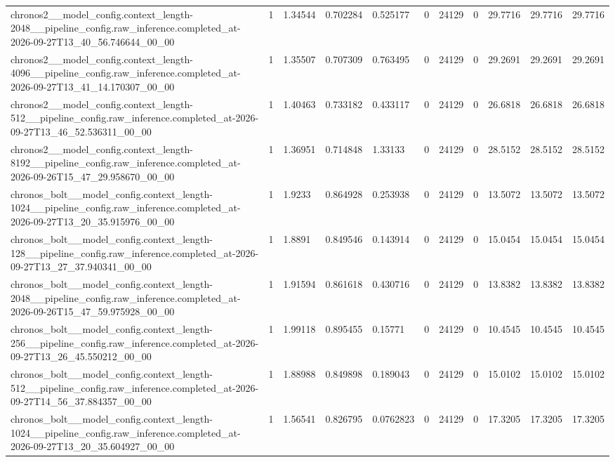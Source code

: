\begin{tabular}{lllllllllll}
chronos2\_\_model\_config.context\_length-2048\_\_pipeline\_config.raw\_inference.completed\_at-2026-09-27T13\_40\_56.746644\_00\_00 & 1 & 1.34544 & 0.702284 & 0.525177 & 0 & 24129 & 0 & 29.7716 & 29.7716 & 29.7716 \\
chronos2\_\_model\_config.context\_length-4096\_\_pipeline\_config.raw\_inference.completed\_at-2026-09-27T13\_41\_14.170307\_00\_00 & 1 & 1.35507 & 0.707309 & 0.763495 & 0 & 24129 & 0 & 29.2691 & 29.2691 & 29.2691 \\
chronos2\_\_model\_config.context\_length-512\_\_pipeline\_config.raw\_inference.completed\_at-2026-09-27T13\_46\_52.536311\_00\_00 & 1 & 1.40463 & 0.733182 & 0.433117 & 0 & 24129 & 0 & 26.6818 & 26.6818 & 26.6818 \\
chronos2\_\_model\_config.context\_length-8192\_\_pipeline\_config.raw\_inference.completed\_at-2026-09-26T15\_47\_29.958670\_00\_00 & 1 & 1.36951 & 0.714848 & 1.33133 & 0 & 24129 & 0 & 28.5152 & 28.5152 & 28.5152 \\
chronos\_bolt\_\_model\_config.context\_length-1024\_\_pipeline\_config.raw\_inference.completed\_at-2026-09-27T13\_20\_35.915976\_00\_00 & 1 & 1.9233 & 0.864928 & 0.253938 & 0 & 24129 & 0 & 13.5072 & 13.5072 & 13.5072 \\
chronos\_bolt\_\_model\_config.context\_length-128\_\_pipeline\_config.raw\_inference.completed\_at-2026-09-27T13\_27\_37.940341\_00\_00 & 1 & 1.8891 & 0.849546 & 0.143914 & 0 & 24129 & 0 & 15.0454 & 15.0454 & 15.0454 \\
chronos\_bolt\_\_model\_config.context\_length-2048\_\_pipeline\_config.raw\_inference.completed\_at-2026-09-26T15\_47\_59.975928\_00\_00 & 1 & 1.91594 & 0.861618 & 0.430716 & 0 & 24129 & 0 & 13.8382 & 13.8382 & 13.8382 \\
chronos\_bolt\_\_model\_config.context\_length-256\_\_pipeline\_config.raw\_inference.completed\_at-2026-09-27T13\_26\_45.550212\_00\_00 & 1 & 1.99118 & 0.895455 & 0.15771 & 0 & 24129 & 0 & 10.4545 & 10.4545 & 10.4545 \\
chronos\_bolt\_\_model\_config.context\_length-512\_\_pipeline\_config.raw\_inference.completed\_at-2026-09-27T14\_56\_37.884357\_00\_00 & 1 & 1.88988 & 0.849898 & 0.189043 & 0 & 24129 & 0 & 15.0102 & 15.0102 & 15.0102 \\
chronos\_bolt\_\_model\_config.context\_length-1024\_\_pipeline\_config.raw\_inference.completed\_at-2026-09-27T13\_20\_35.604927\_00\_00 & 1 & 1.56541 & 0.826795 & 0.0762823 & 0 & 24129 & 0 & 17.3205 & 17.3205 & 17.3205 \\

\end{tabular}
